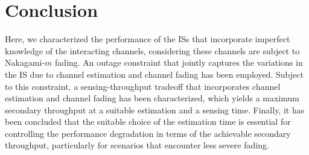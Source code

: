 {%




\section{Conclusion} \label{sec:conc}
Here, we characterized the performance of the ISs that incorporate imperfect knowledge of the interacting channels, considering these channels are subject to Nakagami-$m$ fading. An outage constraint that jointly captures the variations in the IS due to channel estimation and channel fading has been employed. Subject to this constraint, a sensing-throughput tradeoff that incorporates channel estimation and channel fading has been characterized, which yields a maximum secondary throughput at a suitable estimation and a sensing time. Finally, it has been concluded that the suitable choice of the estimation time is essential for controlling the performance degradation in terms of the achievable secondary throughput, particularly for scenarios that encounter less severe fading.  

}
